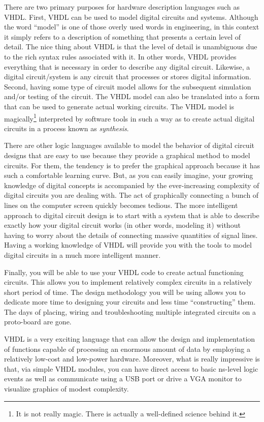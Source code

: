 There are two primary purposes for hardware description languages such as VHDL. First, VHDL can be used to model digital circuits and systems. Although the word ``model'' is one of those overly used words in engineering, in this context it simply refers to a description of something that presents a certain level of detail. The nice thing about VHDL is that the level of detail is unambiguous due to the rich syntax rules associated with it. In other words, VHDL provides everything that is necessary in order to describe any digital circuit. Likewise, a digital circuit/system is any circuit that processes or stores digital information. Second, having some type of circuit model allows for the subsequent simulation and/or testing of the circuit. The VHDL model can also be translated into a form that can be used to generate actual working circuits. The VHDL model is magically\footnote{It is not really magic. There is actually a well-defined science behind it.} interpreted by software tools in such a way as to create actual digital circuits in a process known as \textit{synthesis}.

There are other logic languages available to model the behavior of digital circuit designs that are easy to use because they provide a graphical method to model circuits. For them, the tendency is to prefer the graphical approach because it has such a comfortable learning curve. But, as you can easily imagine, your growing knowledge of digital concepts is accompanied by the ever-increasing complexity of digital circuits you are dealing with. The act of graphically connecting a bunch of lines on the computer screen quickly becomes tedious. The more intelligent approach to digital circuit design is to start with a system that is able to describe exactly how your digital circuit works (in other words, modeling it) without having to worry about the details of connecting massive quantities of signal lines. Having a working knowledge of VHDL will provide you with the tools to model digital circuits in a much more intelligent manner.

Finally, you will be able to use your VHDL code to create actual functioning circuits. This allows you to implement relatively complex circuits in a relatively short period of time. The design methodology you will be using allows you to dedicate more time to designing your circuits and less time ``constructing'' them. The days of placing, wiring and troubleshooting multiple integrated circuits on a proto-board are gone.

VHDL is a very exciting language that can allow the design and implementation of functions capable of processing an enormous amount of data by employing a relatively low-cost and low-power hardware. Moreover, what is really impressive is that, via simple VHDL modules, you can have direct access to basic ns-level logic events as well as communicate using a USB port or drive a VGA monitor to visualize graphics of modest complexity.

